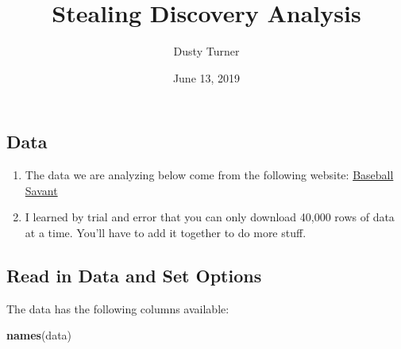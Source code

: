 \documentclass[]{article}
\title{Stealing Discovery Analysis}
\author{Dusty Turner}
\date{June 13, 2019}
\newenvironment{Shaded}{\begin{snugshade}}{\end{snugshade}}
\newcommand{\KeywordTok}[1]{\textcolor[rgb]{0.13,0.29,0.53}{\textbf{#1}}}
\newcommand{\DataTypeTok}[1]{\textcolor[rgb]{0.13,0.29,0.53}{#1}}
\newcommand{\DecValTok}[1]{\textcolor[rgb]{0.00,0.00,0.81}{#1}}
\newcommand{\StringTok}[1]{\textcolor[rgb]{0.31,0.60,0.02}{#1}}
\newcommand{\CommentTok}[1]{\textcolor[rgb]{0.56,0.35,0.01}{\textit{#1}}}
\newcommand{\OperatorTok}[1]{\textcolor[rgb]{0.81,0.36,0.00}{\textbf{#1}}}
\newcommand{\NormalTok}[1]{#1}
\begin{document}
\maketitle

\subsection{Data}\label{data}

\begin{enumerate}
\def\labelenumi{\arabic{enumi}.}
\item
  The data we are analyzing below come from the following website:
  \href{\%22https://baseballsavant.mlb.com/statcast_search\%22}{Baseball
  Savant}
\item
  I learned by trial and error that you can only download 40,000 rows of
  data at a time. You'll have to add it together to do more stuff.
\end{enumerate}

\subsection{Read in Data and Set
Options}\label{read-in-data-and-set-options}

\begin{Shaded}
\end{Shaded}

The data has the following columns available:

\begin{Shaded}
\begin{Highlighting}[]
\KeywordTok{names}\NormalTok{(data)}
\end{Highlighting}
\end{Shaded}
\end{document}

